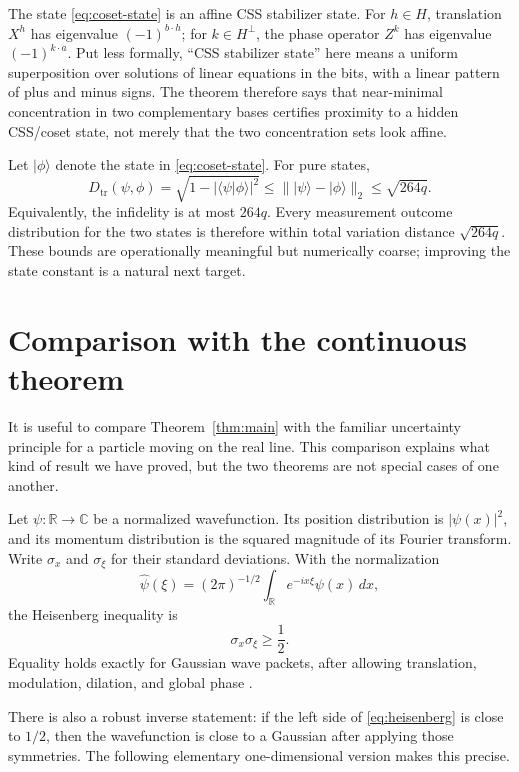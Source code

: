 \documentclass[11pt]{article}
\theoremstyle{remark}
\newcommand{\C}{\mathbb C}
\newcommand{\1}{\mathbf 1}
\newcommand{\disttr}{D_{\mathrm{tr}}}
\begin{document}
The state \eqref{eq:coset-state} is an affine CSS stabilizer state. For
$h\in H$, translation $X^h$ has eigenvalue $(-1)^{b\cdot h}$; for
$k\in H^\perp$, the phase operator $Z^k$ has eigenvalue
$(-1)^{k\cdot a}$. Put less formally, ``CSS stabilizer state'' here means a
uniform superposition over solutions of linear equations in the bits, with
a linear pattern of plus and minus signs. The theorem therefore says that
near-minimal
concentration in two complementary bases certifies proximity to a hidden
CSS/coset state, not merely that the two concentration sets look affine.

Let $|\phi\rangle$ denote the state in \eqref{eq:coset-state}. For pure
states,
\[
  \disttr(\psi,\phi)
  =\sqrt{1-|\langle\psi|\phi\rangle|^2}
  \leq\||\psi\rangle-|\phi\rangle\|_2
  \leq\sqrt{264q}.
\]
Equivalently, the infidelity is at most $264q$. Every measurement outcome
distribution for the two states is therefore within total variation
distance $\sqrt{264q}$. These bounds are operationally meaningful but
numerically coarse; improving the state constant is a natural next target.

\section{Comparison with the continuous theorem}\label{sec:continuous}

It is useful to compare Theorem~\ref{thm:main} with the familiar uncertainty
principle for a particle moving on the real line. This comparison explains
what kind of result we have proved, but the two theorems are not special
cases of one another.

Let $\psi:\mathbb R\to\C$ be a normalized wavefunction. Its position
distribution is $|\psi(x)|^2$, and its momentum distribution is the squared
magnitude of its Fourier transform. Write $\sigma_x$ and $\sigma_\xi$ for
their standard deviations. With the normalization
\[
  \widehat\psi(\xi)
  =(2\pi)^{-1/2}\int_{\mathbb R}e^{-ix\xi}\psi(x)\,dx,
\]
the Heisenberg inequality is
\begin{equation}\label{eq:heisenberg}
  \sigma_x\sigma_\xi\geq\frac12.
\end{equation}
Equality holds exactly for Gaussian wave packets, after allowing
translation, modulation, dilation, and global phase
\cite{FollandSitaram1997}.

There is also a robust inverse statement: if the left side of
\eqref{eq:heisenberg} is close to $1/2$, then the wavefunction is close to a
Gaussian after applying those symmetries. The following elementary
one-dimensional version makes this precise.
\end{document}
